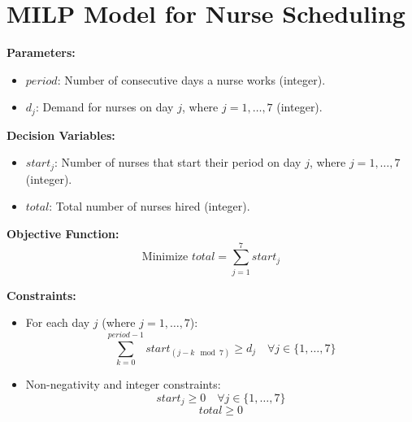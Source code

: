 \documentclass{article}
\begin{document}
\section*{MILP Model for Nurse Scheduling}

\textbf{Parameters:}
\begin{itemize}
    \item $period$: Number of consecutive days a nurse works (integer).
    \item $d_j$: Demand for nurses on day $j$, where $j = 1, \ldots, 7$ (integer).
\end{itemize}

\textbf{Decision Variables:}
\begin{itemize}
    \item $start_j$: Number of nurses that start their period on day $j$, where $j = 1, \ldots, 7$ (integer).
    \item $total$: Total number of nurses hired (integer).
\end{itemize}

\textbf{Objective Function:}
\[
\text{Minimize } total = \sum_{j=1}^{7} start_j
\]

\textbf{Constraints:}
\begin{itemize}
    \item For each day $j$ (where $j = 1, \ldots, 7$):
    \[
    \sum_{k=0}^{period-1} start_{(j-k \mod 7)} \geq d_j \quad \forall j \in \{1, \ldots, 7\}
    \]
    \item Non-negativity and integer constraints:
    \[
    start_j \geq 0 \quad \forall j \in \{1, \ldots, 7\}
    \]
    \[
    total \geq 0
    \]
\end{itemize}
\end{document}
